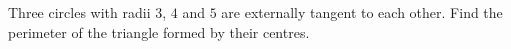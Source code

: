 Three circles with radii $3$, $4$ and $5$ are externally tangent to each other. Find the perimeter of the triangle formed by their centres.
